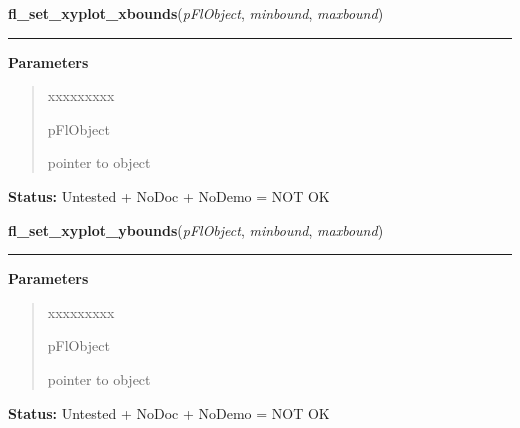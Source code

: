 \hspace{.8\funcindent}\begin{boxedminipage}{\funcwidth}

    \raggedright \textbf{fl\_set\_xyplot\_xbounds}(\textit{pFlObject}, \textit{minbound}, \textit{maxbound})

    \vspace{-1.5ex}

    \rule{\textwidth}{0.5\fboxrule}
\setlength{\parskip}{2ex}
\setlength{\parskip}{1ex}
      \textbf{Parameters}
      \vspace{-1ex}

      \begin{quote}
        \begin{Ventry}{xxxxxxxxx}

          \item[pFlObject]

          pointer to object

        \end{Ventry}

      \end{quote}

\textbf{Status:} Untested + NoDoc + NoDemo = NOT OK



    \end{boxedminipage}

    \label{xformslib:flxyplot:fl_set_xyplot_ybounds}

    \vspace{0.5ex}

\hspace{.8\funcindent}\begin{boxedminipage}{\funcwidth}

    \raggedright \textbf{fl\_set\_xyplot\_ybounds}(\textit{pFlObject}, \textit{minbound}, \textit{maxbound})

    \vspace{-1.5ex}

    \rule{\textwidth}{0.5\fboxrule}
\setlength{\parskip}{2ex}
\setlength{\parskip}{1ex}
      \textbf{Parameters}
      \vspace{-1ex}

      \begin{quote}
        \begin{Ventry}{xxxxxxxxx}

          \item[pFlObject]

          pointer to object

        \end{Ventry}

      \end{quote}

\textbf{Status:} Untested + NoDoc + NoDemo = NOT OK



    \end{boxedminipage}

